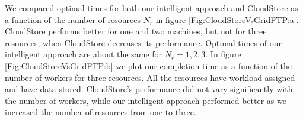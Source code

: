 \documentclass{rspublic}
\begin{document}
We compared optimal times for both our intelligent approach and CloudStore as a function of the number of resources $N_r$ in figure \ref{Fig:CloudStoreVsGridFTP:a}. CloudStore performs better for one and two machines, but not for three resources, when CloudStore decreases its performance. Optimal times of our intelligent approach are about the same for $N_r=1,2,3$. In figure \ref{Fig:CloudStoreVsGridFTP:b} we plot our completion time as a function of the number of workers for three resources. All the resources have workload assigned and have data stored. CloudStore's performance did not vary significantly with the number of workers, while our intelligent approach performed better as we increased the number of resources from one to three.

\begin{figure}
\begin{center}
\end{center}
\end{figure}
\end{document}
